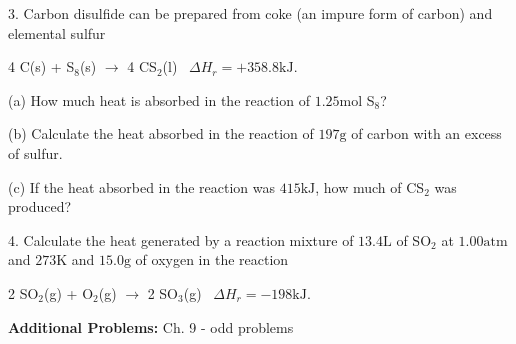 \documentclass[11pt]{article}
\begin{document}
3. Carbon disulfide can be prepared from coke (an impure form of carbon) and
elemental sulfur

\begin{center}
  4 C(s) + S$_8$(s) $\rightarrow$ 4 CS$_2$(l) \, $\Delta H_r = +358.8\text{kJ}$.
\end{center}

(a) How much heat is absorbed in the reaction of $1.25\text{mol}$ S$_8$?

(b) Calculate the heat absorbed in the reaction of $197\text{g}$ of carbon
with an excess of sulfur.

(c) If the heat absorbed in the reaction was $415\text{kJ}$, how much of CS$_2$
was produced?

\vspace{2.5in}

4. Calculate the heat generated by a reaction mixture of $13.4\text{L}$ of SO$_2$
at $1.00\text{atm}$ and $273\text{K}$ and $15.0\text{g}$ of oxygen in the reaction

\begin{center}
  2 SO$_2$(g) + O$_2$(g) $\rightarrow$ 2 SO$_3$(g) \, $\Delta H_r = -198\text{kJ}$.
\end{center}


\vfill
\textbf{Additional Problems:} Ch. 9 - odd problems 
\end{document}
